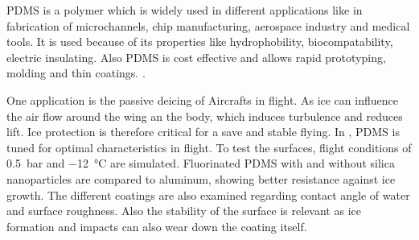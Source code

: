 
PDMS is a polymer which is widely used in different applications like in fabrication of microchannels, chip manufacturing, aerospace industry and medical tools. 
It is used because of its properties like hydrophobility, biocompatability, electric insulating. Also PDMS is cost effective and allows rapid prototyping, molding and thin coatings. \cite{Wolf.2018}. 

One application is the passive deicing of Aircrafts in flight. As ice can influence the air flow around the wing an the body, which induces turbulence and reduces lift. Ice protection is therefore critical for a save and stable flying. In \cite{Liu.2018}, PDMS is tuned for optimal characteristics in flight. To test the surfaces, flight conditions of \SI{0.5}{\bar} and \SI{-12}{\degreeCelsius} are simulated. Fluorinated PDMS with and without silica nanoparticles are compared to aluminum, showing better resistance against ice growth. The different coatings are also examined regarding contact angle of water and surface roughness. Also the stability of the surface is relevant as ice formation and impacts can also wear down the coating itself.  
